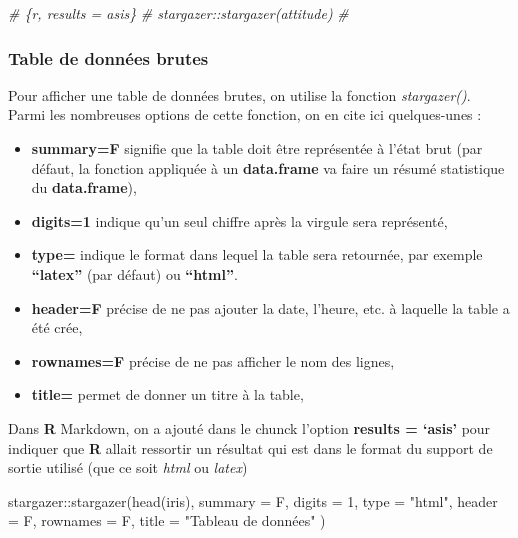 \documentclass[
]{book}
\newenvironment{Shaded}{\begin{snugshade}}{\end{snugshade}}
\newcommand{\AttributeTok}[1]{\textcolor[rgb]{0.77,0.63,0.00}{#1}}
\newcommand{\CommentTok}[1]{\textcolor[rgb]{0.56,0.35,0.01}{\textit{#1}}}
\newcommand{\DecValTok}[1]{\textcolor[rgb]{0.00,0.00,0.81}{#1}}
\newcommand{\FunctionTok}[1]{\textcolor[rgb]{0.00,0.00,0.00}{#1}}
\newcommand{\NormalTok}[1]{#1}
\newcommand{\SpecialCharTok}[1]{\textcolor[rgb]{0.00,0.00,0.00}{#1}}
\newcommand{\StringTok}[1]{\textcolor[rgb]{0.31,0.60,0.02}{#1}}
\theoremstyle{definition}
\theoremstyle{definition}
\theoremstyle{definition}
\theoremstyle{definition}
\theoremstyle{remark}
\begin{document}
\begin{Shaded}
\begin{Highlighting}[]
\CommentTok{\# \textasciigrave{}\textasciigrave{}\textasciigrave{}\{r, results = \textquotesingle{}asis\textquotesingle{}\}}
\CommentTok{\# stargazer::stargazer(attitude)}
\CommentTok{\# \textasciigrave{}\textasciigrave{}\textasciigrave{}}
\end{Highlighting}
\end{Shaded}

\hypertarget{table-de-donnuxe9es-brutes}{%
\subsubsection{Table de données brutes}\label{table-de-donnuxe9es-brutes}}

Pour afficher une table de données brutes, on utilise la fonction \emph{stargazer()}. Parmi les nombreuses options de cette fonction, on en cite ici quelques-unes :

\begin{itemize}
\item
  \textbf{summary=F} signifie que la table doit être représentée à l'état brut (par défaut, la fonction appliquée à un \textbf{data.frame} va faire un résumé statistique du \textbf{data.frame}),
\item
  \textbf{digits=1} indique qu'un seul chiffre après la virgule sera représenté,
\item
  \textbf{type=} indique le format dans lequel la table sera retournée, par exemple \textbf{``latex''} (par défaut) ou \textbf{``html''}.
\item
  \textbf{header=F} précise de ne pas ajouter la date, l'heure, etc. à laquelle la table a été crée,
\item
  \textbf{rownames=F} précise de ne pas afficher le nom des lignes,
\item
  \textbf{title=} permet de donner un titre à la table,
\end{itemize}

Dans \textbf{R} Markdown, on a ajouté dans le chunck l'option \textbf{results = `asis'} pour indiquer que \textbf{R} allait ressortir un résultat qui est dans le format du support de sortie utilisé (que ce soit \emph{html} ou \emph{latex})

\begin{Shaded}
\begin{Highlighting}[]
\NormalTok{stargazer}\SpecialCharTok{::}\FunctionTok{stargazer}\NormalTok{(}\FunctionTok{head}\NormalTok{(iris), }\AttributeTok{summary =}\NormalTok{ F, }\AttributeTok{digits =} \DecValTok{1}\NormalTok{, }\AttributeTok{type =} \StringTok{"html"}\NormalTok{, }
          \AttributeTok{header =}\NormalTok{ F, }\AttributeTok{rownames =}\NormalTok{ F, }\AttributeTok{title =} \StringTok{"Tableau de données"}
\NormalTok{          )}
\end{Highlighting}
\end{Shaded}
\end{document}
